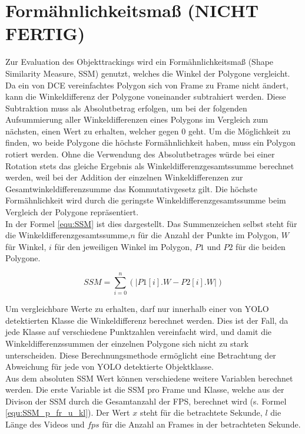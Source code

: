 \section{Formähnlichkeitsmaß (NICHT FERTIG)}{ \label{theo:SSM}
	Zur Evaluation des Objekttrackings wird ein Formähnlichkeitsmaß (\glqq Shape Similarity Measure\grqq{}, SSM) genutzt, welches die Winkel der Polygone vergleicht. \\
	Da ein von DCE vereinfachtes Polygon sich von Frame zu Frame nicht ändert, kann die Winkeldifferenz der Polygone voneinander subtrahiert werden. Diese Subtraktion muss als Absolutbetrag erfolgen, um bei der folgenden Aufsummierung aller Winkeldifferenzen eines Polygons im Vergleich zum nächsten, einen Wert zu erhalten, welcher gegen 0 geht. Um die Möglichkeit zu finden, wo beide Polygone die höchste Formähnlichkeit haben, muss ein Polygon rotiert werden. Ohne die Verwendung des Absolutbetrages würde bei einer Rotation stets das gleiche Ergebnis als Winkeldifferenzgesamtssumme berechnet werden, weil bei der Addition der einzelnen Winkeldifferenzen zur Gesamtwinkeldifferenzsumme das Kommutativgesetz gilt. Die höchste Formähnlichkeit wird durch die geringste Winkeldifferenzgesamtssumme beim Vergleich der Polygone repräsentiert.\\
	In der Formel \ref{equ:SSM} ist dies dargestellt. Das Summenzeichen selbst steht für die Winkeldifferenzgesamtssumme,$n$ für die Anzahl der Punkte im Polygon, $W$ für Winkel, $i$ für den jeweiligen Winkel im Polygon, $P1$ und $P2$ für die beiden Polygone.

	\begin{equation} \label{equ:SSM}
		SSM = \sum_{i = 0}^{n}  (\lvert P1[i].W - P2[i].W \rvert)
	\end{equation}	

	Um vergleichbare Werte zu erhalten, darf nur innerhalb einer von YOLO detektierten Klasse die Winkeldifferenz berechnet werden. Dies ist der Fall, da jede Klasse auf verschiedene Punktzahlen vereinfacht wird, und damit die Winkeldifferenzssummen der einzelnen Polygone sich nicht zu stark unterscheiden. Diese Berechnungsmethode ermöglicht eine Betrachtung der Abweichung für jede von YOLO detektierte Objektklasse. \\
	Aus dem absoluten SSM Wert können verschiedene weitere Variablen berechnet werden. Die erste Variable ist die SSM pro Frame und Klasse, welche aus der Divison der SSM durch die Gesamtanzahl der FPS, berechnet wird (s. Formel \ref{equ:SSM_p_fr_u_kl}). Der Wert $x$ steht für die betrachtete Sekunde, $l$ die Länge des Videos und $\textit{fps}$ für die Anzahl an Frames in der betrachteten Sekunde.
 
}

